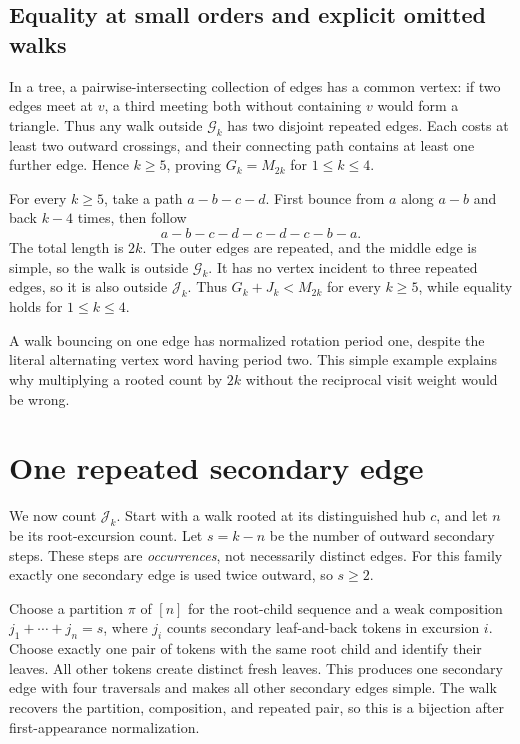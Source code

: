 \documentclass[11pt,letterpaper]{article}
\theoremstyle{remark}\newtheorem{remark}[theorem]{Remark}
\newcommand{\Gc}{\mathcal G}\newcommand{\Hc}{\mathcal H}\newcommand{\Jc}{\mathcal J}
\theoremstyle{definition}\newtheorem{definition}[theorem]{Definition}
\begin{document}
\subsection{Equality at small orders and explicit omitted walks}
In a tree, a pairwise-intersecting collection of edges has a common vertex: if two edges meet at $v$, a third meeting both without containing $v$ would form a triangle. Thus any walk outside $\Gc_k$ has two disjoint repeated edges. Each costs at least two outward crossings, and their connecting path contains at least one further edge. Hence $k\ge5$, proving $G_k=M_{2k}$ for $1\le k\le4$.

For every $k\ge5$, take a path $a-b-c-d$. First bounce from $a$ along $a-b$ and back $k-4$ times, then follow
\[
 a-b-c-d-c-d-c-b-a.
\]
The total length is $2k$. The outer edges are repeated, and the middle edge is simple, so the walk is outside $\Gc_k$. It has no vertex incident to three repeated edges, so it is also outside $\Jc_k$. Thus $G_k+J_k<M_{2k}$ for every $k\ge5$, while equality holds for $1\le k\le4$.

A walk bouncing on one edge has normalized rotation period one, despite the literal alternating vertex word having period two. This simple example explains why multiplying a rooted count by $2k$ without the reciprocal visit weight would be wrong.

\section{One repeated secondary edge}
We now count $\Jc_k$. Start with a walk rooted at its distinguished hub $c$, and let $n$ be its root-excursion count. Let $s=k-n$ be the number of outward secondary steps. These steps are \emph{occurrences}, not necessarily distinct edges. For this family exactly one secondary edge is used twice outward, so $s\ge2$.

Choose a partition $\pi$ of $[n]$ for the root-child sequence and a weak composition $j_1+\cdots+j_n=s$, where $j_i$ counts secondary leaf-and-back tokens in excursion $i$. Choose exactly one pair of tokens with the same root child and identify their leaves. All other tokens create distinct fresh leaves. This produces one secondary edge with four traversals and makes all other secondary edges simple. The walk recovers the partition, composition, and repeated pair, so this is a bijection after first-appearance normalization.
\end{document}
